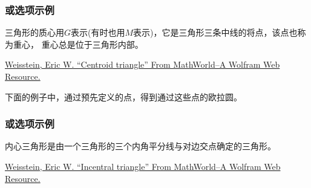 \documentclass[../main.tex]{subfiles}
\begin{document}
\subsubsection{或选项示例}

三角形的质心用$G$表示(有时也用$M$表示)，它是三角形三条中线的将点，该点也称为重心，
重心总是位于三角形内部。\par
\href{https://mathworld.wolfram.com/TriangleCentroid.html}{Weisstein, Eric W.
\enquote{Centroid triangle} From MathWorld--A Wolfram Web Resource.}

下面的例子中，通过预先定义的点，得到通过这些点的欧拉圆。

\begin{tkzexample}[latex=7cm,small]
\end{tkzexample}

\newpage

\subsubsection{或选项示例}

内心三角形是由一个三角形的三个内角平分线与对边交点确定的三角形。\par
\href{https://mathworld.wolfram.com/ContactTriangle.html}{Weisstein, Eric W.
\enquote{Incentral triangle} From MathWorld--A Wolfram Web Resource.}
\end{document}
